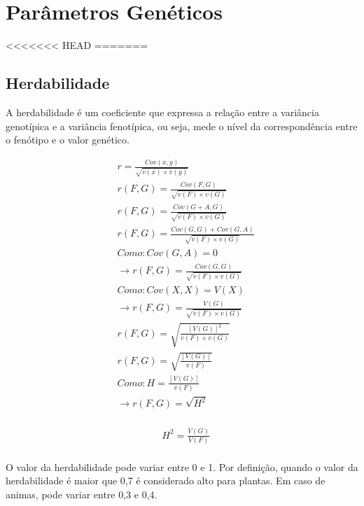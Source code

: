 \chapter{Parâmetros Genéticos}

<<<<<<< HEAD
=======
\section{Herdabilidade}

A herdabilidade é um coeficiente que expressa a relação entre a variância genotípica e a variância fenotípica, ou seja, mede o nível da correspondência entre o fenótipo e o valor genético. 

\begin{definition}

\begin{align}
&  r = \frac{Cov(x,y)}{\sqrt{v(x) \times v(y)}} \\
&  r(F,G) = \frac{Cov(F,G)}{\sqrt{v(F) \times v(G)}} \\
&  r(F,G) = \frac{Cov(G+A,G)}{\sqrt{v(F) \times v(G)}} \\
&  r(F,G) = \frac{Cov(G,G) + Cov(G,A)}{\sqrt{v(F) \times v(G)}} \\
&  Como: Cov(G,A) = 0 \\
&  \rightarrow r(F,G) = \frac{Cov(G,G)}{\sqrt{v(F) \times v(G)}} \\
&  Como: Cov(X,X) = V(X) \\
&  \rightarrow r(F,G) = \frac{V(G)}{\sqrt{v(F) \times v(G)}} \\
&  r(F,G) = \sqrt{\frac{[V(G)]^2}{v(F) \times v(G)}} \\
&  r(F,G) = \sqrt{\frac{[V(G)]}{v(F)}} \\
&  Como: H = \frac{[V(G)]}{v(F)} \\
&  \rightarrow  r(F,G) = \sqrt{H^2} \\
\end{align}
\end{definition}


\begin{definition}

\begin{align}
&  H^2 = \frac{V(G)}{V(F)} \\
\end{align}
\end{definition}

O valor da herdabilidade pode variar entre 0 e 1. Por definição, quando o valor da herdabilidade é maior que 0,7 é considerado alto para plantas. Em caso de animas, pode variar entre 0,3 e 0,4.




